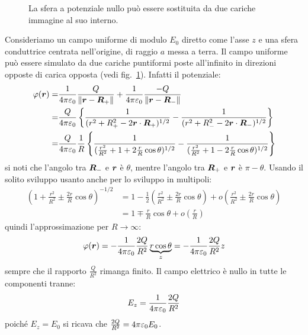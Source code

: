 \begin{Es}
  \begin{figure}[H]
    \centering
    
    \caption{La sfera a potenziale nullo può essere sostituita da due cariche immagine al suo interno.}
    \label{fig:esempio_campo_sfera}
  \end{figure}

  Consideriamo un campo uniforme di modulo $E_0$ diretto come l'asse $z$ e una sfera conduttrice centrata nell'origine, di raggio $a$ messa a terra. Il campo uniforme può essere simulato da due cariche puntiformi poste all'infinito in direzioni opposte di carica opposta (vedi fig.~\ref{fig:esempio_campo_sfera}). Infatti il potenziale:
  \[
    \begin{aligned}
      \varphi(\boldsymbol{r})= & \frac{1}{4\pi\varepsilon_0}\frac{Q}{\left\lVert\boldsymbol{r} - \boldsymbol{R}_+\right\rVert}+\frac{1}{4\pi\varepsilon_0}\frac{-Q}{\left\lVert\boldsymbol{r}-\boldsymbol{R}_-\right\rVert}                                                               \\
      =               & \frac{Q}{4\pi\varepsilon_0}\left\{\frac{1}{(r^2+R^2_+-2\boldsymbol{r}\cdot \boldsymbol{R}_+)^{1/2}}-\frac{1}{(r^2+R_-^2-2\boldsymbol{r}\cdot\boldsymbol{R}_-)^{1/2}}\right\}                                   \\
      =               & \frac{Q}{4\pi\varepsilon_0}\frac{1}{R}\left\{\frac{1}{(\frac{r^2}{R^2}+1+2\frac{r}{R}\cos\theta)^{1/2}}-\frac{1}{(\frac{r^2}{R^2}+1-2\frac{r}{R}\cos\theta)^{1/2}}\right\}
    \end{aligned}
  \]
  si noti che l'angolo tra $\boldsymbol{R}_-$ e $\boldsymbol{r}$ è $\theta$, mentre l'angolo tra $\boldsymbol{R}_+$ e $\boldsymbol{r}$ è $\pi-\theta$. Usando il solito sviluppo usanto anche per lo sviluppo in multipoli:
  \[
    \begin{aligned}
      \left(1+\frac{r^2}{R^2}\pm\frac{2r}{R}\cos\theta\right)^{-1/2} & =1-\frac{1}{2}\left(\frac{r^2}{R^2}\pm\frac{2r}{R}\cos\theta\right)+o\left(\frac{r^2}{R^2}\pm\frac{2r}{R}\cos\theta\right) \\
                                                                     & =1\mp\frac{r}{R}\cos\theta+o\left(\frac{r}{R}\right)
    \end{aligned}
  \]
  quindi l'approssimazione per $R\to\infty$:
  \[
    \varphi(\boldsymbol{r})=-\frac{1}{4\pi\varepsilon_0}\frac{2Q}{R^2}\underbrace{r\cos\theta}_z=-\frac{1}{4\pi\varepsilon_0}\frac{2Q}{R^2}z
  \]
  sempre che il rapporto $\frac{Q}{R^2}$ rimanga finito. Il campo elettrico è nullo in tutte le componenti tranne:
  \[
    E_z = \frac{1}{4\pi\varepsilon_0}\frac{2Q}{R^2}
  \]
  poiché $E_z=E_0$ si ricava che $\frac{2Q}{R^2} = 4\pi\varepsilon_0 E_0$.


\end{Es}
